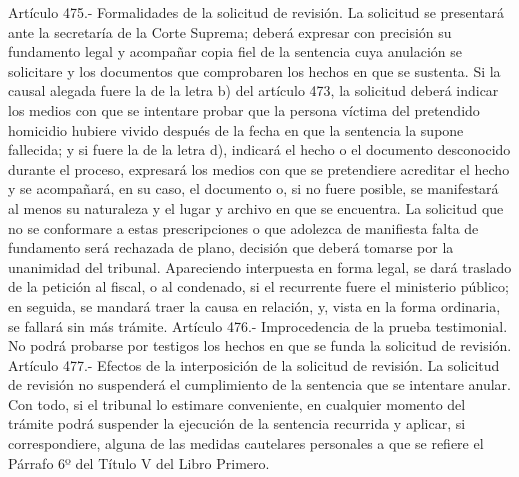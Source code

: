     Artículo 475.- Formalidades de la solicitud de revisión. La solicitud se presentará ante la secretaría de la Corte Suprema; deberá expresar con precisión su fundamento legal y acompañar copia fiel de la sentencia cuya anulación se solicitare y los documentos que comprobaren los hechos en que se sustenta.
    Si la causal alegada fuere la de la letra b) del artículo 473, la solicitud deberá indicar los medios con que se intentare probar que la persona víctima del pretendido homicidio hubiere vivido después de la fecha en que la sentencia la supone fallecida; y si fuere la de la letra d), indicará el hecho o el documento desconocido durante el proceso, expresará los medios con que se pretendiere acreditar el hecho y se acompañará, en su caso, el documento o, si no fuere posible, se manifestará al menos su naturaleza y el lugar y archivo en que se encuentra.
    La solicitud que no se conformare a estas prescripciones o que adolezca de manifiesta falta de fundamento será rechazada de plano, decisión que deberá tomarse por la unanimidad del tribunal.
    Apareciendo interpuesta en forma legal, se dará traslado de la petición al fiscal, o al condenado, si el recurrente fuere el ministerio público; en seguida, se mandará traer la causa en relación, y, vista en la forma ordinaria, se fallará sin más trámite.
    Artículo 476.- Improcedencia de la prueba testimonial. No podrá probarse por testigos los hechos en que se funda la solicitud de revisión.
    Artículo 477.- Efectos de la interposición de la solicitud de revisión. La solicitud de revisión no suspenderá el cumplimiento de la sentencia que se intentare anular.
    Con todo, si el tribunal lo estimare conveniente, en cualquier momento del trámite podrá suspender la ejecución de la sentencia recurrida y aplicar, si correspondiere, alguna de las medidas cautelares personales a que se refiere el Párrafo 6º del Título V del Libro Primero.

